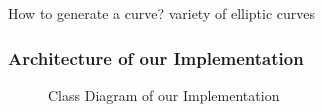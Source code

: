 \documentclass{beamer}
\begin{document}
\begin{frame}{How to generate a curve?}
variety of elliptic curves
\begin{figure}[htp] 
\end{figure}  
\end{frame} 


\begin{frame}
\frametitle{Architecture of our Implementation}
\begin{figure}[htp] 
\caption{Class Diagram of our Implementation}
\end{figure}  
\end{frame}
\end{document}
